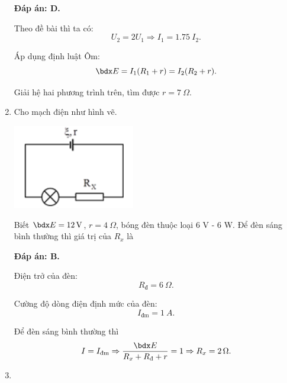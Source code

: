 \begin{enumerate}[label=\bfseries Câu \arabic*:]
{	}
	\loigiai
	{	\textbf{Đáp án: D.}
		
		Theo đề bài thì ta có:
		$$U_2 = 2U_1 \Rightarrow I_1 = \SI{1.75}{} I_2.$$
		
		Áp dụng định luật Ôm:
		$$\calE = I_1 (R_1 + r) = I_2 (R_2 +r).$$
		
		Giải hệ hai phương trình trên, tìm được $r=\SI{7}{\Omega}$.
	}
	\item {}
	
	\cauhoi
	{Cho mạch điện như hình vẽ.
		\begin{center}
			\includegraphics{../figs/VN11-2021-PH-TP014-1}
		\end{center}
	Biết $\calE = \SI{12}{V}$, $r=\SI{4}{\Omega}$, bóng đèn thuộc loại 6 V - 6 W. Để đèn sáng bình thường thì giá trị của $R_x$ là
		
	}
	\loigiai
	{	\textbf{Đáp án: B.}
		
		Điện trở của đèn:
		$$R_\text{đ} = \SI{6}{\Omega}.$$
		
		Cường độ dòng điện định mức của đèn:
		$$I_\text{đm} = \SI{1}{A}.$$
		
		Để đèn sáng bình thường thì
		$$I= I_\text{đm} \Rightarrow \dfrac{\calE}{R_x + R_\text{đ} + r} = 1 \Rightarrow R_x = \SI{2}{\Omega}.$$
	}
	\item {}
	

\end{enumerate}
